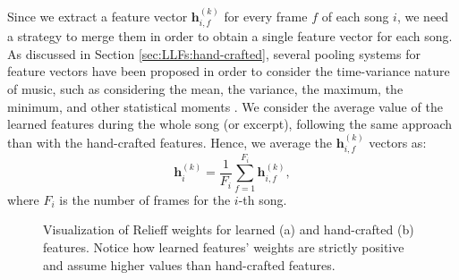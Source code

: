 Since we extract a feature vector $\mathbf{h}^{(k)}_{i,f}$ for every frame $f$ of each song $i$, we need a strategy to merge them in order to obtain a single feature vector for each song.
As discussed in Section \ref{sec:LLFs:hand-crafted}, several pooling systems for feature vectors have been proposed in order to consider the time-variance nature of music, such as considering the mean, the variance, the maximum, the minimum, and other statistical moments \cite{hamel2011}. We consider the average value of the learned features during the whole song (or excerpt), following the same approach than \cite{Bestagini2013b} with the hand-crafted features. Hence, we average the $\mathbf{h}^{(k)}_{i,f}$ vectors as:
\begin{equation}
\mathbf{h}^{(k)}_i=\frac{1}{F_i} \sum_{f=1}^{F_i} \mathbf{h}^{(k)}_{i,f},
\label{eq:feature}
\end{equation}
where $F_i$ is the number of frames for the $i$-th song.

\begin{figure}[t]
\centering    
{} \hfil
{}
\caption{Visualization of Relieff weights for learned (a) and hand-crafted (b) features. Notice how learned features' weights are strictly positive and assume higher values than hand-crafted features.}
\label{fig:Bootleg:relieff}
\end{figure}

